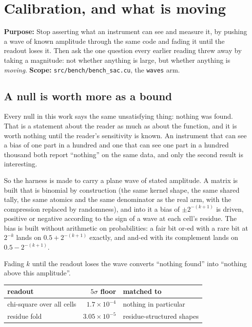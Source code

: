 \chapter{Calibration, and what is moving}

\textbf{Purpose:} Stop asserting what an instrument can see and measure it, by pushing a wave of
known amplitude through the same code and fading it until the readout loses it. Then ask the one
question every earlier reading threw away by taking a magnitude: not whether anything is large, but
whether anything is \emph{moving}. \textbf{Scope:}
\texttt{src/\allowbreak{}bench/\allowbreak{}bench\_\allowbreak{}sac.\allowbreak{}cu}, the
\texttt{waves} arm.

\section{A null is worth more as a bound}

Every null in this work says the same unsatisfying thing: nothing was found. That is a statement
about the reader as much as about the function, and it is worth nothing until the reader's
sensitivity is known. An instrument that can see a bias of one part in a hundred and one that can
see one part in a hundred thousand both report ``nothing'' on the same data, and only the second
result is interesting.

So the harness is made to carry a plane wave of stated amplitude. A matrix is built that is
binomial by construction (the same kernel shape, the same shared tally, the same atomics and the
same denominator as the real arm, with the compression replaced by randomness), and into it a
bias of \(\pm 2^{-(k+1)}\) is driven, positive or negative according to the sign of a wave at each
cell's residue. The bias is built without arithmetic on probabilities: a fair bit or-ed with a rare
bit at \(2^{-k}\) lands on \(0.5 + 2^{-(k+1)}\) exactly, and and-ed with its complement lands on
\(0.5 - 2^{-(k+1)}\).

Fading \(k\) until the readout loses the wave converts ``nothing found'' into ``nothing above this
amplitude''.

\begin{center}
\begin{tabular}{lrl}
\toprule
readout & \(5\sigma\) floor & matched to \\
\midrule
chi-square over all cells & \(1.7 \times 10^{-4}\) & nothing in particular \\
residue fold & \(3.05 \times 10^{-5}\) & residue-structured shapes \\
\bottomrule
\end{tabular}
\end{center}

